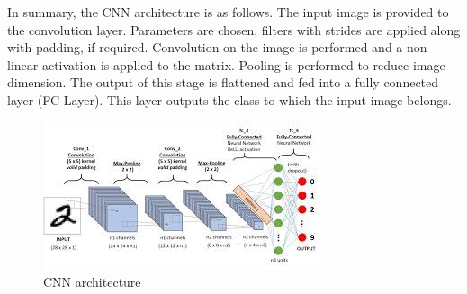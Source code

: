 In summary, the CNN architecture is as follows. The input image is provided to the convolution layer. Parameters are chosen, filters with strides are applied along with padding, if required. Convolution on the image is performed and a non linear activation is applied to the matrix. Pooling is performed to reduce image dimension. The output of this stage is flattened and fed into a fully connected layer (FC Layer). This layer outputs the class to which the input image belongs.
\begin{figure}[H]
\centering
	\includegraphics[scale=1.25]{Chapter2/cnn.jpeg}	
	\caption{CNN architecture}
	\label{fig:CNN}
\end{figure}
